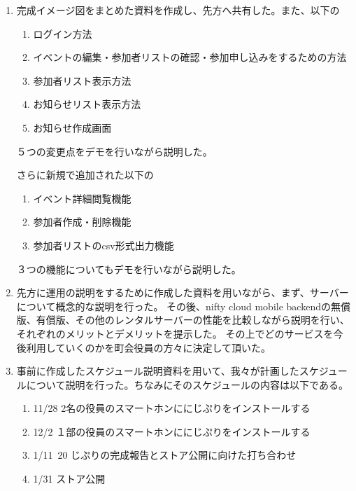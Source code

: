 \begin{enumerate}
    \item 完成イメージ図をまとめた資料を作成し、先方へ共有した。また、以下の
    \begin{enumerate}
        \item ログイン方法
        \item イベントの編集・参加者リストの確認・参加申し込みをするための方法
        \item 参加者リスト表示方法
        \item お知らせリスト表示方法
        \item お知らせ作成画面
    \end{enumerate}
    ５つの変更点をデモを行いながら説明した。

    さらに新規で追加された以下の
    \begin{enumerate}
        \item イベント詳細閲覧機能
        \item 参加者作成・削除機能
        \item 参加者リストのcsv形式出力機能
    \end{enumerate}
    ３つの機能についてもデモを行いながら説明した。

    \item 先方に運用の説明をするために作成した資料を用いながら、まず、サーバーについて概念的な説明を行った。
    その後、nifty cloud mobile backendの無償版、有償版、その他のレンタルサーバーの性能を比較しながら説明を行い、それぞれのメリットとデメリットを提示した。
    その上でどのサービスを今後利用していくのかを町会役員の方々に決定して頂いた。

    \item 事前に作成したスケジュール説明資料を用いて、我々が計画したスケジュールについて説明を行った。ちなみにそのスケジュールの内容は以下である。
    \begin{enumerate}
        \item 11/28 2名の役員のスマートホンににじぷりをインストールする
        \item 12/2 １部の役員のスマートホンににじぷりをインストールする
        \item 1/11~20 じぷりの完成報告とストア公開に向けた打ち合わせ
        \item 1/31 ストア公開
    \end{enumerate}
\end{enumerate}

